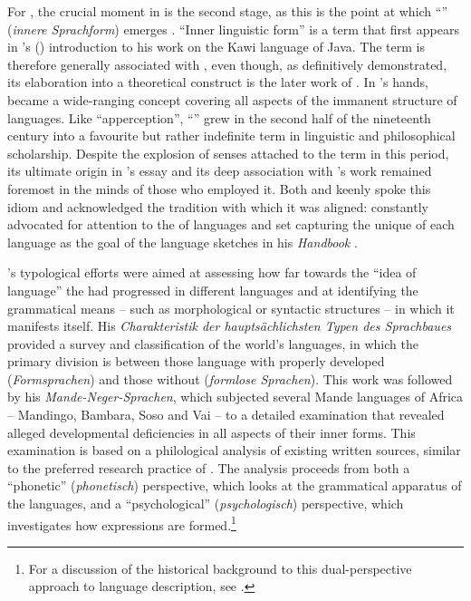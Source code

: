 \documentclass[output=paper]{langscibook}
\begin{document}
For {\Steinthal}, the crucial moment in  is the second stage, as this is the point at which ``'' (\emph{innere Sprachform}) emerges \citep[425--426]{Steinthal1881}. ``Inner linguistic form'' is a term that first appears in {\Humboldt}'s (\citeyear{Humboldt19981836}) introduction to his work on the Kawi language of Java. The term is therefore generally associated with {\Humboldt}, even though, as \citet{Borsche1989} definitively demonstrated, its elaboration into a theoretical construct is the later work of {\Steinthal}. In {\Steinthal}'s hands,  became a wide-ranging concept covering all aspects of the immanent structure of languages. Like ``apperception'', ``'' grew in the second half of the nineteenth century into a favourite but rather indefinite term in linguistic and philosophical scholarship. Despite the explosion of senses attached to the term in this period, its ultimate origin in {\Humboldt}'s essay and its deep association with {\Steinthal}'s work remained foremost in the minds of those who employed it. Both {\Brinton} and {\Boas} keenly spoke this idiom and acknowledged the tradition with which it was aligned: {\Brinton} constantly advocated for attention to the  of languages and \citet[81]{Boas1911} set capturing the unique  of each language as the goal of the language sketches in his \emph{Handbook} \citep[cf.][98--105]{Darnell1988}. 

{\Steinthal}'s typological efforts were aimed at assessing how far towards the ``idea of language'' the  had progressed in different languages and at identifying the grammatical means -- such as morphological or syntactic structures -- in which it manifests itself. His \citeyear{Steinthal1860} \emph{Charakteristik der hauptsächlichsten Typen des Sprachbaues} provided a survey and classification of the world's languages, in which the primary division is between those language with properly developed  (\emph{Formsprachen}) and those without (\emph{formlose Sprachen}). This work was followed by his \citeyear{Steinthal1867} \emph{Mande-Neger-Sprachen}, which subjected several Mande languages of Africa -- Mandingo, Bambara, Soso and Vai -- to a detailed examination that revealed alleged developmental deficiencies in all aspects of their inner forms. This examination is based on a philological analysis of existing written sources, similar to the preferred research practice of {\Brinton}. The analysis proceeds from both a ``phonetic'' (\emph{phonetisch}) perspective, which looks at the grammatical apparatus of the languages, and a ``psychological'' (\emph{psychologisch}) perspective, which investigates how expressions are formed.\footnote{For a discussion of the historical background to this dual-perspective approach to language description, see \citet[2--6]{McElvenny2017}.}
\end{document}
